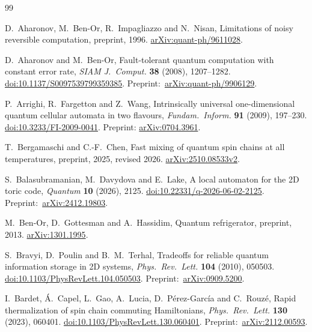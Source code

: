 \begin{thebibliography}{99}
{}
\raggedright\frenchspacing
\setlength{\itemsep}{2pt}\setlength{\parsep}{0pt}

D.~Aharonov, M.~Ben-Or, R.~Impagliazzo and N.~Nisan,
Limitations of noisy reversible computation,
preprint, 1996.
\href{https://arxiv.org/abs/quant-ph/9611028}{arXiv:quant-ph/9611028}.

D.~Aharonov and M.~Ben-Or,
Fault-tolerant quantum computation with constant error rate,
\emph{SIAM J.~Comput.} \textbf{38} (2008), 1207--1282.
\href{https://doi.org/10.1137/S0097539799359385}{doi:10.1137/S0097539799359385}.
Preprint:~\href{https://arxiv.org/abs/quant-ph/9906129}{arXiv:quant-ph/9906129}.

P.~Arrighi, R.~Fargetton and Z.~Wang,
Intrinsically universal one-dimensional quantum cellular automata in two flavours,
\emph{Fundam.~Inform.} \textbf{91} (2009), 197--230.
\href{https://doi.org/10.3233/FI-2009-0041}{doi:10.3233/FI-2009-0041}.
Preprint: \href{https://arxiv.org/abs/0704.3961}{arXiv:0704.3961}.

T.~Bergamaschi and C.-F.~Chen,
Fast mixing of quantum spin chains at all temperatures,
preprint, 2025, revised 2026.
\href{https://arxiv.org/abs/2510.08533v2}{arXiv:2510.08533v2}.

S.~Balasubramanian, M.~Davydova and E.~Lake,
A local automaton for the 2D toric code,
\emph{Quantum} \textbf{10} (2026), 2125.
\href{https://doi.org/10.22331/q-2026-06-02-2125}{doi:10.22331/q-2026-06-02-2125}.
Preprint:~\href{https://arxiv.org/abs/2412.19803}{arXiv:2412.19803}.

M.~Ben-Or, D.~Gottesman and A.~Hassidim,
Quantum refrigerator,
preprint, 2013.
\href{https://arxiv.org/abs/1301.1995}{arXiv:1301.1995}.

S.~Bravyi, D.~Poulin and B.~M.~Terhal,
Tradeoffs for reliable quantum information storage in 2D systems,
\emph{Phys.~Rev.~Lett.} \textbf{104} (2010), 050503.
\href{https://doi.org/10.1103/PhysRevLett.104.050503}{doi:10.1103/PhysRevLett.104.050503}.
Preprint:~\href{https://arxiv.org/abs/0909.5200}{arXiv:0909.5200}.

I.~Bardet, \'A.~Capel, L.~Gao, A.~Lucia,
D.~P\'erez-Garc\'ia and C.~Rouz\'e,
Rapid thermalization of spin chain commuting Hamiltonians,
\emph{Phys.~Rev.~Lett.} \textbf{130} (2023), 060401.
\href{https://doi.org/10.1103/PhysRevLett.130.060401}{doi:10.1103/PhysRevLett.130.060401}.
Preprint:~\href{https://arxiv.org/abs/2112.00593}{arXiv:2112.00593}.


\end{thebibliography}
